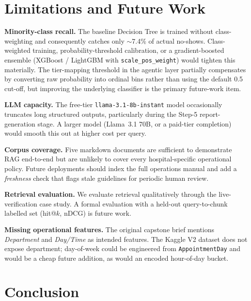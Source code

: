 \documentclass[11pt,a4paper]{article}
\begin{document}
\section{Limitations and Future Work}\label{sec:limitations}

\textbf{Minority-class recall.} The baseline Decision Tree is trained
without class-weighting and consequently catches only $\sim$7.4\% of
actual no-shows. Class-weighted training, probability-threshold
calibration, or a gradient-boosted ensemble (XGBoost / LightGBM with
\texttt{scale\_pos\_weight}) would tighten this materially. The
tier-mapping threshold in the agentic layer partially compensates by
converting raw probability into ordinal bins rather than using the
default 0.5 cut-off, but improving the underlying classifier is the
primary future-work item.

\textbf{LLM capacity.} The free-tier
\texttt{llama-3.1-8b-instant} model occasionally truncates long
structured outputs, particularly during the Step-5 report-generation
stage. A larger model (Llama~3.1 70B, or a paid-tier completion) would
smooth this out at higher cost per query.

\textbf{Corpus coverage.} Five markdown documents are sufficient to
demonstrate RAG end-to-end but are unlikely to cover every
hospital-specific operational policy. Future deployments should index
the full operations manual and add a \emph{freshness} check that flags
stale guidelines for periodic human review.

\textbf{Retrieval evaluation.} We evaluate retrieval qualitatively
through the live-verification case study. A formal evaluation with a
held-out query-to-chunk labelled set (hit@$k$, nDCG) is future work.

\textbf{Missing operational features.} The original capstone brief
mentions \emph{Department} and \emph{Day/Time} as intended features.
The Kaggle V2 dataset does not expose department; day-of-week could be
engineered from \texttt{AppointmentDay} and would be a cheap future
addition, as would an encoded hour-of-day bucket.

\section{Conclusion}
\end{document}
